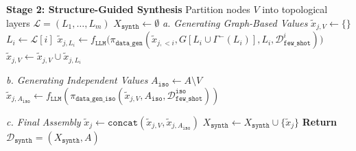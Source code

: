 \begin{algorithm*}
\begin{algorithmic}[1]
\vspace{0.3cm}

\Statex \textbf{Stage 2: Structure-Guided Synthesis}
\State Partition nodes $V$ into topological layers $\mathcal{L} = (L_1, \dots, L_m)$
\State $X_{\mathtt{synth}} \gets \emptyset$
    \Statex \hspace{\algorithmicindent} \textit{a. Generating Graph-Based Values}
    \State $\tilde{x}_{j,V} \gets \{\}$
        \State $L_i \gets \mathcal{L}[i]$
        \State $\tilde{x}_{j,L_i} \gets f_{\mathtt{LLM}}\Big(\pi_{\mathtt{data\_gen}}(\tilde{x}_{j,<i}, G[L_i \cup \Gamma^-(L_i)], L_i, \mathcal{D}_{\mathtt{few\_shot}}^i)\Big)$
        \State $\tilde{x}_{j,V} \gets \tilde{x}_{j,V} \cup \tilde{x}_{j,L_i}$
    \EndFor
    
    \Statex \hspace{\algorithmicindent} \textit{b. Generating Independent Values}
    \State $A_{\mathtt{iso}} \gets A \setminus V$
    \State $\tilde{x}_{j, A_{\mathtt{iso}}} \gets f_{\mathtt{LLM}}(\pi_{\mathtt{data\_gen\_iso}}(\tilde{x}_{j,V}, A_{\mathtt{iso}}, \mathcal{D}_{\mathtt{few\_shot}}^{\mathtt{iso}}))$
    
    \Statex \hspace{\algorithmicindent} \textit{c. Final Assembly}
    \State $\tilde{x}_j \gets \mathtt{concat}(\tilde{x}_{j,V}, \tilde{x}_{j,A_{\mathtt{iso}}})$
    \State $X_{\mathtt{synth}} \gets X_{\mathtt{synth}} \cup \{\tilde{x}_j\}$
\EndFor
\State \textbf{Return} $\mathcal{D}_{\mathtt{synth}} = (X_{\mathtt{synth}}, A)$
\end{algorithmic}
\end{algorithm*}

